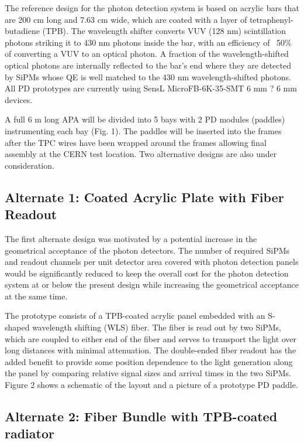 The reference design for the photon detection system is based on acrylic bars that are 200 cm long and 7.63 cm wide, which are coated with a layer of tetraphenyl-butadiene (TPB). The wavelength shifter converts VUV (128 nm) scintillation photons striking it to 430 nm photons inside the bar, with an efficiency of ~50\% of converting a VUV to an optical photon.  A fraction of the wavelength-shifted optical photons are internally reflected to the bar's end where they are detected by SiPMs whose QE is well matched to the 430 nm wavelength-shifted photons. All PD prototypes are currently using SensL MicroFB-6K-35-SMT 6 mm ? 6 mm devices. 

A full 6 m long APA will be divided into 5 bays with 2 PD modules (paddles) instrumenting each bay (Fig.  1). The paddles will be inserted into the frames after the TPC wires have been wrapped around the frames allowing  final assembly at the CERN test location. Two alternative designs are also under consideration. 

\subsection{Alternate 1: Coated Acrylic Plate with Fiber Readout}

The first alternate design was motivated by a potential increase in the geometrical acceptance of the photon detectors. The number of required SiPMs and readout channels per unit detector area covered with photon detection panels would be significantly reduced to keep the overall cost for the photon detection system at or below the present design while increasing the geometrical acceptance at the same time.

The prototype consists of a TPB-coated acrylic panel embedded with an S-shaped wavelength shifting (WLS) fiber. The fiber is read out by two SiPMs, which are coupled to either end of the fiber and serves to transport the light over long distances with minimal attenuation. The double-ended fiber readout has the added benefit to provide some position dependence to the light generation along the panel by comparing relative signal sizes and arrival times in the two SiPMs. Figure 2 shows a schematic of the layout and a picture of a prototype PD paddle.

\subsection{Alternate 2: Fiber Bundle with TPB-coated radiator}

